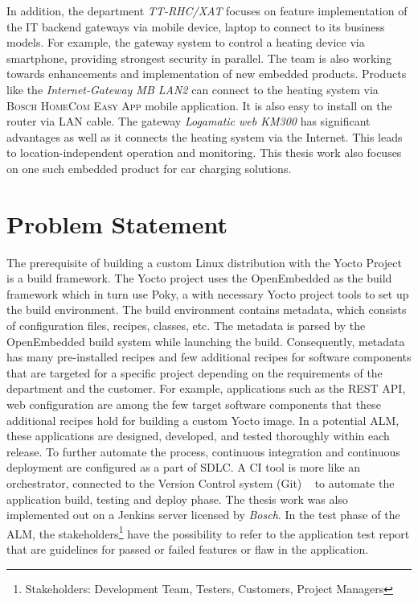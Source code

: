 In addition, the department \emph{TT-RHC/XAT} focuses on feature implementation of the IT backend gateways via mobile device, laptop to connect to its business models. For example, the gateway system to control a heating device via smartphone, providing strongest security in parallel. The team is also working towards enhancements and implementation of new embedded products. Products like the \emph{ Internet-Gateway MB LAN2} can connect to the heating system via \textsc{Bosch HomeCom Easy App} mobile application. It is also easy to install on the router via LAN cable. The gateway \emph{Logamatic web KM300} has significant advantages as well as it connects the heating system via the Internet. This leads to location-independent operation and monitoring. This thesis work also focuses on one such embedded product for car charging solutions.


\section{Problem Statement}

The prerequisite of building a custom Linux distribution with the Yocto Project is a build framework. The Yocto project uses the OpenEmbedded as the build framework which in turn use Poky, a  with necessary Yocto project tools to set up the build environment. The build environment contains metadata, which consists of configuration files, recipes, classes, etc.  The metadata is parsed by the OpenEmbedded build system while launching the build. Consequently, metadata has many pre-installed recipes and few additional recipes for software components that are targeted for a specific project depending on the requirements of the department and the customer. For example, applications such as the \ac{REST} \ac{API}, web configuration are among the few target software components that these additional recipes hold for building a custom Yocto image. In a potential \ac{ALM}, these applications are designed, developed, and tested thoroughly within each release. To further automate the process, continuous integration and continuous deployment are configured as a part of \ac{SDLC}. A \ac{CI} tool is more like an orchestrator, connected to the Version Control system (Git) ~\parencite{pathania2017learning} to automate the application build, testing and deploy phase. The thesis work was also implemented out on a Jenkins server licensed by \emph{Bosch}. In the test phase of the \ac{ALM}, the stakeholders\footnote{Stakeholders: Development Team, Testers, Customers, Project Managers} have the possibility to refer to the application test report that are guidelines for passed or failed features or flaw in the application.

